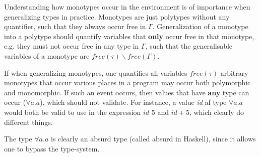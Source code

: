 Understanding how monotypes occur in the environment is of importance when generalizing types in practice.
Monotypes are just polytypes without any quantifier, such that they always occur free in $\Gamma$.
Generalization of a monotype into a polytype should quantify variables that \textbf{only} occur free in that monotype, e.g. they must not occur free in any type in $\Gamma$, such that the generalisable variables of a monotype are $\textit{free}(\tau) \backslash \textit{free}(\Gamma)$.

If when generalizing monotypes, one quantifies all variables $\textit{free}(\tau)$ arbitrary monotypes that occur various places in a program may occur both polymorphic and monomorphic.
If such an event occurs, then values that have \textbf{any} type can occur ($\forall a.a$), which should not validate.
For instance, a value \textit{id} af type $\forall a.a$ would both be valid to use in the expression $\textit{id } 5$ and $\textit{id} + 5$, which clearly do different things.
\begin{remark}
  The type $\forall a.a$ is clearly an absurd type (called absurd in Haskell), since it allows one to bypass the type-system.
\end{remark}

